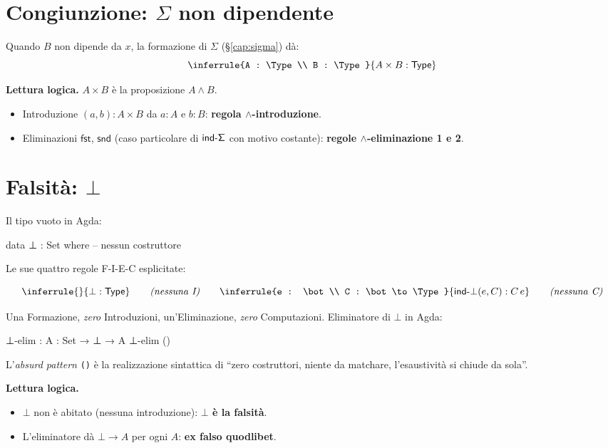\section*{Congiunzione: $\Sigma$ non dipendente}

Quando $B$ non dipende da $x$, la formazione di $\Sigma$ (\S\ref{cap:sigma}) d\`a:
\[
\inferrule{A : \Type \\ B : \Type}{A \times B : \Type}
\]

\noindent\textbf{Lettura logica.} $A \times B$ \`e la proposizione $A \wedge B$.

\begin{itemize}
\item Introduzione $(a, b) : A \times B$ da $a : A$ e $b : B$: \textbf{regola $\wedge$-introduzione}.
\item Eliminazioni $\mathsf{fst}$, $\mathsf{snd}$ (caso particolare di $\mathsf{ind\text{-}\Sigma}$ con motivo costante): \textbf{regole $\wedge$-eliminazione 1 e 2}.
\end{itemize}

\section*{Falsit\`a: $\bot$}

Il tipo vuoto in Agda:

\begin{agda}
data ⊥ : Set where
  -- nessun costruttore
\end{agda}

Le sue quattro regole F-I-E-C esplicitate:

\[
\inferrule{ }{\bot : \Type}
\qquad
\textit{(nessuna I)}
\qquad
\inferrule{e : \bot \\ C : \bot \to \Type}{\mathsf{ind}\text{-}\bot(e, C) : C\,e}
\qquad
\textit{(nessuna C)}
\]

Una Formazione, \emph{zero} Introduzioni, un'Eliminazione, \emph{zero} Computazioni. Eliminatore di $\bot$ in Agda:

\begin{agda}
⊥-elim : {A : Set} → ⊥ → A
⊥-elim ()
\end{agda}

L'\emph{absurd pattern} \texttt{()} \`e la realizzazione sintattica di ``zero costruttori, niente da matchare, l'esaustivit\`a si chiude da sola''.

\noindent\textbf{Lettura logica.}
\begin{itemize}
\item $\bot$ non \`e abitato (nessuna introduzione): \textbf{$\bot$ \`e la falsit\`a}.
\item L'eliminatore d\`a $\bot \to A$ per ogni $A$: \textbf{ex falso quodlibet}.
\end{itemize}

